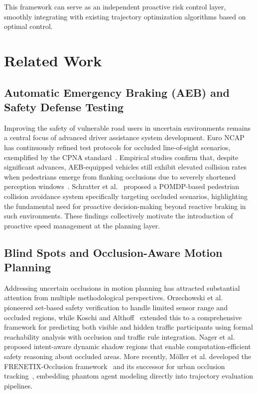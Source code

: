 \documentclass[conference]{IEEEtran}
\begin{document}
This framework can serve as an independent proactive risk control layer, smoothly integrating with existing trajectory optimization algorithms based on optimal control.

\section{Related Work}

\subsection{Automatic Emergency Braking (AEB) and Safety Defense Testing}
Improving the safety of vulnerable road users in uncertain environments remains a central focus of advanced driver assistance system development. Euro NCAP has continuously refined test protocols for occluded line-of-sight scenarios, exemplified by the CPNA standard~\cite{euroncap2023}. Empirical studies confirm that, despite significant advances, AEB-equipped vehicles still exhibit elevated collision rates when pedestrians emerge from flanking occlusions due to severely shortened perception windows~\cite{cicchino2022effects}. Schratter et al.~\cite{schratter2019occlusion} proposed a POMDP-based pedestrian collision avoidance system specifically targeting occluded scenarios, highlighting the fundamental need for proactive decision-making beyond reactive braking in such environments. These findings collectively motivate the introduction of proactive speed management at the planning layer.

\subsection{Blind Spots and Occlusion-Aware Motion Planning}
Addressing uncertain occlusions in motion planning has attracted substantial attention from multiple methodological perspectives. Orzechowski et al.~\cite{orzechowski2018tackling} pioneered set-based safety verification to handle limited sensor range and occluded regions, while Koschi and Althoff~\cite{koschi2021setbased} extended this to a comprehensive framework for predicting both visible and hidden traffic participants using formal reachability analysis with occlusion and traffic rule integration. Nager et al.~\cite{nager2019shadows} proposed intent-aware dynamic shadow regions that enable computation-efficient safety reasoning about occluded areas. More recently, M\"{o}ller et al. developed the FRENETIX-Occlusion framework~\cite{blindspot2024} and its successor for urban occlusion tracking~\cite{occtrack2025}, embedding phantom agent modeling directly into trajectory evaluation pipelines.
\end{document}
